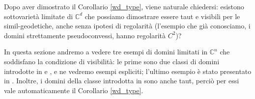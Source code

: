 Dopo aver dimostrato il Corollario \ref{wd_type}, viene naturale chiedersi: esistono sottovarietà limitate di $\mathbb{C}^d$ che possiamo dimostrare essere taut e visibili per le simil-geodetiche, anche senza ipotesi di regolarità (l'esempio che già conosciamo, i domini strettamente pseudoconvessi, hanno regolarità $C^2$)?

In questa sezione andremo a vedere tre esempi di domini limitati in $\mathbb{C}^n$ che soddisfano la condizione di visibilità: le prime sono due classi di domini introdotte in \cite{BZ1} e \cite{BM}, e ne vedremo esempi espliciti; l'ultimo esempio è stato presentato in \cite{CMS}. Inoltre, i domini della classe introdotta in \cite{BM} sono anche taut, perciò per essi vale automaticamente il Corollario \ref{wd_type}.